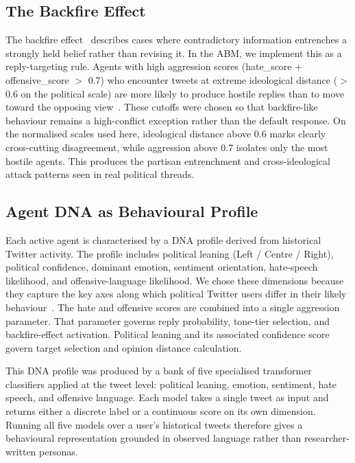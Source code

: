 \documentclass[logo,bsc,singlespacing,parskip,online]{infthesis}
\begin{document}
\subsection{The Backfire Effect}

The backfire effect~\citep{nyhan2010corrections} describes cases where contradictory information entrenches a strongly held belief rather than revising it. In the ABM, we implement this as a reply-targeting rule. Agents with high aggression scores (hate\_score + offensive\_score $>$ 0.7) who encounter tweets at extreme ideological distance ($>$ 0.6 on the political scale) are more likely to produce hostile replies than to move toward the opposing view~\citep{druckman2022framework,diehl2016political,brady2017emotion}. These cutoffs were chosen so that backfire-like behaviour remains a high-conflict exception rather than the default response. On the normalised scales used here, ideological distance above 0.6 marks clearly cross-cutting disagreement, while aggression above 0.7 isolates only the most hostile agents. This produces the partisan entrenchment and cross-ideological attack patterns seen in real political threads.

\subsection{Agent DNA as Behavioural Profile}

Each active agent is characterised by a DNA profile derived from historical Twitter activity. The profile includes political leaning (Left / Centre / Right), political confidence, dominant emotion, sentiment orientation, hate-speech likelihood, and offensive-language likelihood. We chose these dimensions because they capture the key axes along which political Twitter users differ in their likely behaviour~\citep{antypas2023negativity,tun2023sentiment,smith2022politicalcontent}. The hate and offensive scores are combined into a single aggression parameter. That parameter governs reply probability, tone-tier selection, and backfire-effect activation. Political leaning and its associated confidence score govern target selection and opinion distance calculation.

This DNA profile was produced by a bank of five specialised transformer classifiers applied at the tweet level: political leaning, emotion, sentiment, hate speech, and offensive language. Each model takes a single tweet as input and returns either a discrete label or a continuous score on its own dimension. Running all five models over a user's historical tweets therefore gives a behavioural representation grounded in observed language rather than researcher-written personas.
\end{document}
